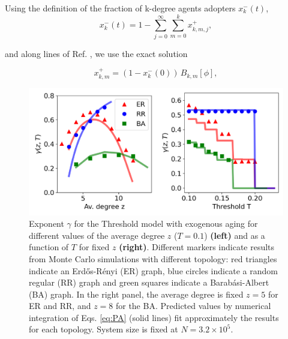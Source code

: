 Using the definition of the fraction of k-degree agents adopters $x^{-}_{k} (t)$,
\begin{equation}
    x^{-}_{k}(t) = 1 - \sum_{j=0}^{\infty} \sum_{m = 0}^k x^{+}_{k,m,j},
\end{equation}

and along lines of Ref. \cite{gleeson-2013}, we use the exact solution

\begin{equation}
    x^{+}_{k,m} = (1 - x^{-}_{k} (0)) \, B_{k,m}[\phi],
\end{equation}

\begin{figure}
    \centering \captionsetup{font=sf}
    \includegraphics[width=0.7\columnwidth]{Figs/Aging_Threshold/EXO.pdf}
    \caption[Exponent $\gamma$ for the Threshold model with exogenous aging]{\label{fig:exo_exp} Exponent $\gamma$ for the Threshold model with exogenous aging for different values of the average degree $z$ ($T = 0.1$) \textbf{(left)} and as a function of  $T$ for fixed $z$ \textbf{(right)}. Different markers indicate results from Monte Carlo simulations with different topology: red triangles indicate an Erd\H{o}s-R\'enyi (ER) graph, blue circles indicate a random regular (RR) graph and green squares indicate a Barab\'asi-Albert (BA) graph. In the right panel, the average degree is fixed $z = 5$ for ER and RR, and $z = 8$ for the BA. Predicted values by numerical integration of Eqs. \eqref{eq:PA} (solid lines) fit approximately the results for each topology. System size is fixed at $N = 3.2 \times 10^5$.}
    \end{figure}

